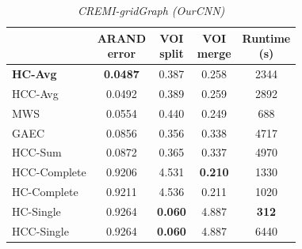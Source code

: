 \begin{table}[t]
        \centering
    \tiny
        \begin{subtable}[t]{0.29\textwidth}
        \centering
        \begin{tabular}[t]{lcccc}
        \toprule
          & \makecell{ARAND\\error} & \makecell{VOI\\split} & \makecell{VOI\\merge}&  \makecell{Runtime\\(s)} \\ \midrule 
\textbf{HC-Avg} & \textbf{0.0487} & 0.387 & 0.258 & 2344 \\
HCC-Avg & 0.0492 & 0.389 & 0.259 & 2892 \\
MWS \cite{wolf2018mutex} & 0.0554 & 0.440 & 0.249 & 688 \\
GAEC \cite{keuper2015efficient} & 0.0856 & 0.356 & 0.338 & 4717 \\
HCC-Sum & 0.0872 & 0.365 & 0.337 & 4970 \\
HCC-Complete & 0.9206 & 4.531 & \textbf{0.210} & 1330 \\
HC-Complete & 0.9211 & 4.536 & 0.211 & 1020 \\
HC-Single & 0.9264 & \textbf{0.060} & 4.887 & \textbf{312} \\
HCC-Single & 0.9264 & \textbf{0.060} & 4.887 & 6440 \\
        \end{tabular}
    \caption{\emph{CREMI-gridGraph (OurCNN)}}
    \label{tab:scores_gridGraph}
    \centering
    \tiny
    \end{subtable}\hfill

\end{table}

